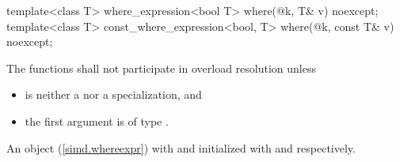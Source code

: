 \begin{itemdecl}
template<class T>
  where_expression<bool T>
    where(@\seebelow@ k, T& v) noexcept;
template<class T>
  const_where_expression<bool, T>
    where(@\seebelow@ k, const T& v) noexcept;
\end{itemdecl}

\begin{itemdescr}
  \pnum\remarks
  The functions shall not participate in overload resolution unless

  \begin{itemize}
    \item {} is neither a  nor a  specialization, and
    \item the first argument is of type .
  \end{itemize}

  \pnum\returns
  An object (\ref{simd.whereexpr}) with  and  initialized with  and  respectively.
\end{itemdescr}

